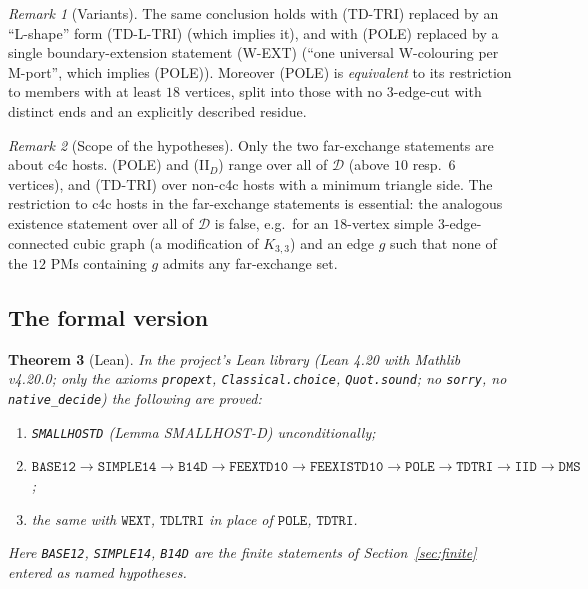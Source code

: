 \documentclass[11pt]{amsart}
\newtheorem{theorem}{Theorem}[section]
\theoremstyle{definition}
\theoremstyle{remark}
\newtheorem{remark}[theorem]{Remark}
\newcommand{\cD}{\mathcal{D}}
\newcommand{\hyp}[1]{\textup{(#1)}}
\newcommand{\Lean}{\textsf{Lean}}
\begin{document}
\begin{remark}[Variants]\label{rem:variants}
The same conclusion holds with \hyp{TD-TRI} replaced by an ``L-shape'' form \hyp{TD-L-TRI} (which implies it), and with \hyp{POLE} replaced by a single boundary-extension statement \hyp{W-EXT} (``one universal W-colouring per M-port'', which implies \hyp{POLE}). Moreover \hyp{POLE} is \emph{equivalent} to its restriction to members with at least $18$ vertices, split into those with no $3$-edge-cut with distinct ends and an explicitly described residue.
\end{remark}

\begin{remark}[Scope of the hypotheses]
Only the two far-exchange statements are about c4c hosts. \hyp{POLE} and \hyp{II$_D$} range over all of $\cD$ (above $10$ resp.\ $6$ vertices), and \hyp{TD-TRI} over non-c4c hosts with a minimum triangle side. The restriction to c4c hosts in the far-exchange statements is essential: the analogous existence statement over all of $\cD$ is false, e.g.\ for an $18$-vertex simple $3$-edge-connected cubic graph (a modification of $K_{3,3}$) and an edge $g$ such that none of the $12$ PMs containing $g$ admits any far-exchange set.
\end{remark}

\subsection{The formal version}

\begin{theorem}[\Lean]\label{thm:lean-cs4}
In the project's \Lean{} library (Lean 4.20 with Mathlib v4.20.0; only the axioms \texttt{propext}, \texttt{Classical.choice}, \texttt{Quot.sound}; no \texttt{sorry}, no \texttt{native\_decide}) the following are proved:
\begin{enumerate}[label=(\arabic*)]
\item \texttt{SMALLHOSTD} (Lemma SMALLHOST-D) unconditionally;
\item $\texttt{BASE12}\to\texttt{SIMPLE14}\to\texttt{B14D}\to\texttt{FEEXTD10}\to\texttt{FEEXISTD10}\to\texttt{POLE}\to\texttt{TDTRI}\to\texttt{IID}\to\texttt{DMS}$;
\item the same with $\texttt{WEXT}$, $\texttt{TDLTRI}$ in place of $\texttt{POLE}$, $\texttt{TDTRI}$.
\end{enumerate}
Here \texttt{BASE12}, \texttt{SIMPLE14}, \texttt{B14D} are the finite statements of Section~\ref{sec:finite} entered as named hypotheses.
\end{theorem}
\end{document}
